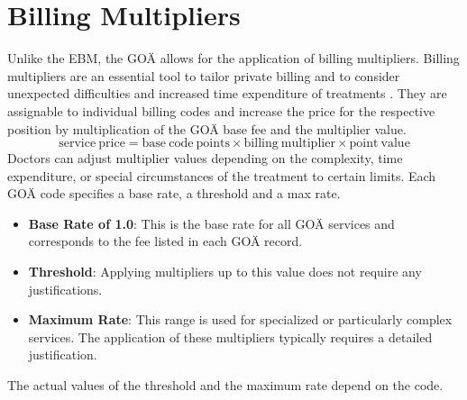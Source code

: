 \section{Billing Multipliers}\label{sec:billing-multipliers}
Unlike the EBM, the GOÄ allows for the application of billing multipliers.
Billing multipliers are an essential tool to tailor private billing and to consider unexpected difficulties and increased time expenditure of treatments \cite{walter2008abrechnung}.
They are assignable to individual billing codes and increase the price for the respective position by multiplication of the GOÄ base fee and the multiplier value.
\[
    \mathrm{service\ price} = \mathrm{base\ code\ points} \times \mathrm{billing\ multiplier} \times \mathrm{point\ value}
\]
Doctors can adjust multiplier values depending on the complexity, time expenditure, or special circumstances of the treatment to certain limits.
Each GOÄ code specifies a base rate, a threshold and a max rate\cite{bruck1998kommentar}.
\begin{itemize}
    \item \textbf{Base Rate of 1.0}: This is the base rate for all GOÄ services and corresponds to the fee listed in each GOÄ record.
    \item \textbf{Threshold}: Applying multipliers up to this value does not require any justifications.
    \item \textbf{Maximum Rate}: This range is used for specialized or particularly complex services.
    The application of these multipliers typically requires a detailed justification.
\end{itemize}
The actual values of the threshold and the maximum rate depend on the code.

